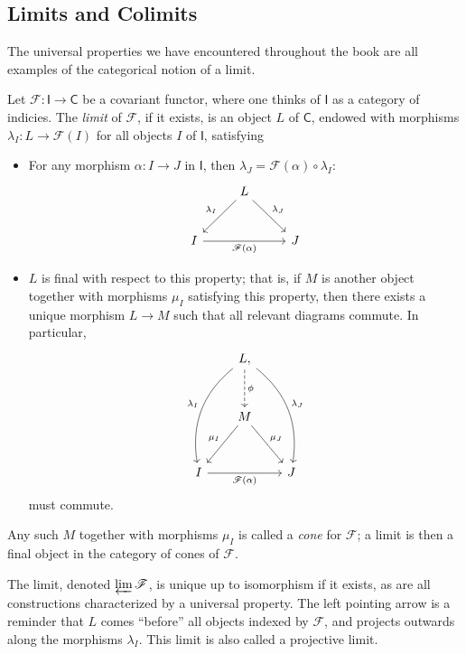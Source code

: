 \subsection{Limits and Colimits}
The universal properties we have encountered throughout the book are all examples of the categorical notion of a limit.
\begin{definition}[Limit]\label{dfn:8.4}
	Let $\mathscr{F} : \mathsf{I}  \to \mathsf{C}$ be a covariant functor, where one thinks of $\mathsf{I} $ as a category of indicies. The \emph{limit} of $\mathscr{F} $, if it exists, is an object $L$ of $\mathsf{C} $, endowed with morphisms $\lambda_I : L \to \mathscr{F} (I)$ for all objects $I$ of $\mathsf{I} $, satisfying
	\begin{itemize}
		\item For any morphism $\alpha : I \to J$ in $\mathsf{I} $, then $\lambda_J =\mathscr{F} (\alpha)\circ \lambda_I$:
			\[\begin{tikzcd}[row sep = 2.5em, column sep = 2.5em]
				&L\arrow[dl, "\lambda_I"']\arrow[dr, "\lambda _J"]\\
				I\arrow[rr, "\mathscr{F} (\alpha )"']&&J
			\end{tikzcd}\]
		\item $L$ is final with respect to this property; that is, if $M$ is another object together with morphisms $\mu_I$ satisfying this property, then there exists a unique morphism $L\to M$ such that all relevant diagrams commute. In particular,
			\[\begin{tikzcd}[row sep = 3em, column sep = 2em]
				&L\arrow[ddl, bend right, "\lambda_I"']\arrow[ddr, bend left, "\lambda _J"],\arrow[d, dashed, "\phi "]\\
				&M\arrow[dl, "\mu_I"']\arrow[dr, "\mu_J"]\\
				I\arrow[rr, "\mathscr{F} (\alpha )"']&&J
			\end{tikzcd}\]
			must commute.
	\end{itemize}
\end{definition}
\begin{remark}
	Any such $M$ together with morphisms $\mu_I$ is called a \emph{cone} for $\mathscr{F} $; a limit is then a final object in the category of cones of $\mathscr{F} $.
\end{remark}

The limit, denoted $\varprojlim \mathscr{F} $, is unique up to isomorphism if it exists, as are all constructions characterized by a universal property. The left pointing arrow is a reminder that $L$ comes ``before'' all objects indexed by $\mathscr{F} $, and projects outwards along the morphisms $\lambda_I$. This limit is also called a projective limit.

